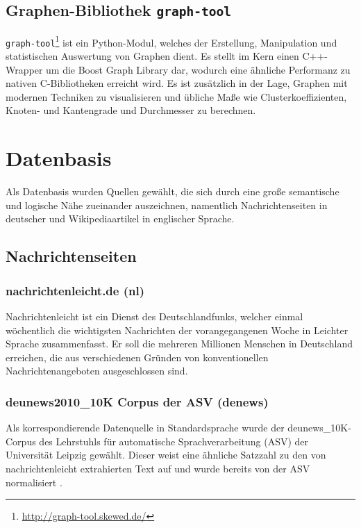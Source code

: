 \documentclass[11pt, a4paper]{article}
\begin{document}
\subsection{Graphen-Bibliothek \texttt{graph-tool}}
\texttt{graph-tool}\footnote{\url{http://graph-tool.skewed.de/}} ist ein
Python-Modul, welches der Erstellung, Manipulation und statistischen
Auswertung von Graphen dient. Es stellt im Kern einen C++-Wrapper um die Boost
Graph Library dar, wodurch eine \"ahnliche Performanz zu nativen C-Bibliotheken
erreicht wird. Es ist zus\"atzlich in der Lage, Graphen mit modernen Techniken
zu visualisieren und \"ubliche Ma\ss{}e wie Clusterkoeffizienten, Knoten-
und Kantengrade und Durchmesser zu berechnen.


\section{Datenbasis}
\label{sec:datenbasis}

Als Datenbasis wurden Quellen gew\"ahlt, die sich durch eine gro\ss{}e
semantische und logische N\"ahe zueinander auszeichnen, namentlich
Nachrichtenseiten in deutscher und Wikipediaartikel in englischer Sprache.

\subsection{Nachrichtenseiten}
\label{nrseiten}

\subsubsection{nachrichtenleicht.de (nl)}

Nachrichtenleicht ist ein Dienst des Deutschlandfunks, welcher einmal
w\"ochentlich die wichtigsten Nachrichten der vorangegangenen Woche in Leichter
Sprache zusammenfasst. Er soll die mehreren Millionen Menschen in Deutschland
erreichen, die aus verschiedenen Gr\"unden von konventionellen
Nachrichtenangeboten ausgeschlossen sind.

\subsubsection{deunews2010\_10K Corpus der ASV (denews)}

Als korrespondierende Datenquelle in Standardsprache wurde der
deunews\_10K-Corpus des Lehrstuhls f\"ur automatische Sprachverarbeitung
(ASV) der Universit\"at Leipzig gew\"ahlt. Dieser weist eine \"ahnliche Satzzahl
zu den von nachrichtenleicht extrahierten Text auf und wurde bereits von der ASV
normalisiert \cite{Quasthoff2006}.
\end{document}
